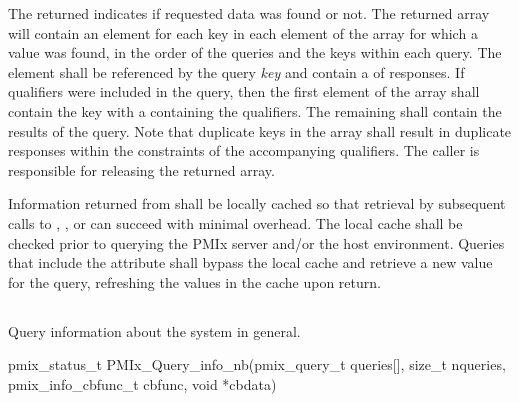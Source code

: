 The returned  indicates if requested data was found or not. The returned  array will contain an element for each key in each element of the  array for which a value was found, in the order of the queries and the keys within each query. The element shall be referenced by the query \emph{key} and contain a  of  responses. If qualifiers were included in the query, then the first element of the array shall contain the  key with a  containing the qualifiers. The remaining  shall contain the results of the query. Note that duplicate keys in the  array shall result in duplicate responses within the constraints of the accompanying qualifiers. The caller is responsible for releasing the returned array.

\adviceimplstart
Information returned from  shall be locally cached so that retrieval by subsequent calls to , , or  can succeed with minimal overhead. The local cache shall be checked prior to querying the \ac{PMIx} server and/or the host environment. Queries that include the  attribute shall bypass the local cache and retrieve a new value for the query, refreshing the values in the cache upon return.
\adviceimplend

\subsection{}

\summary

Query information about the system in general.

\format

\cspecificstart
\begin{codepar}
pmix_status_t
PMIx_Query_info_nb(pmix_query_t queries[], size_t nqueries,
                   pmix_info_cbfunc_t cbfunc, void *cbdata)
\end{codepar}
\cspecificend

\begin{arglist}
\end{arglist}

